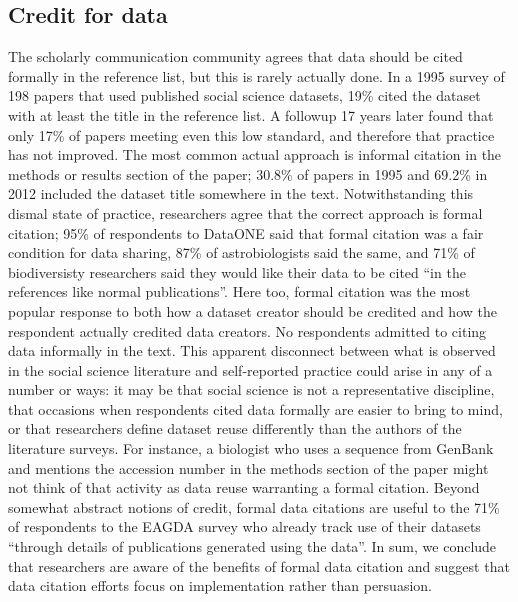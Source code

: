 \documentclass[10pt]{article}
\begin{document}
\subsection*{Credit for data}

The scholarly communication community agrees that data should be cited formally in the reference list\cite{force11_data_citation_synthesis_group_joint_2014}, but this is rarely actually done\cite{sieber_not_1995, mooney_citing_2011, mooney_anatomy_2012}.
In a 1995 survey of 198 papers that used published social science datasets, 19\% cited the dataset with at least the title in the reference list\cite{sieber_not_1995}.
A followup 17 years later found that only 17\% of papers meeting even this low standard, and therefore that practice has not improved\cite{mooney_anatomy_2012}.
The most common actual approach is informal citation in the methods or results section of the paper; 30.8\% of papers in 1995 and 69.2\% in 2012 included the dataset title somewhere in the text.
Notwithstanding this dismal state of practice, researchers agree that the correct approach is formal citation; 95\% of respondents to DataONE said that formal citation was a fair condition for data sharing, 87\% of astrobiologists said the same, and 71\% of biodiversisty researchers said they would like their data to be cited ``in the references like normal publications''\cite{tenopir_data_2011, aydingolu_data_2014, enke_user's_2012}.
Here too, formal citation was the most popular response to both how a dataset creator should be credited and how the respondent actually credited data creators.
No respondents admitted to citing data informally in the text.
This apparent disconnect between what is observed in the social science literature and self-reported practice could arise in any of a number or ways: it may be that social science is not a representative discipline, that occasions when respondents cited data formally are easier to bring to mind, or that researchers define dataset reuse differently than the authors of the literature surveys.
For instance, a biologist who uses a sequence from GenBank and mentions the accession number in the methods section of the paper might not think of that activity as data reuse warranting a formal citation.
Beyond somewhat abstract notions of credit, formal data citations are useful to the 71\% of respondents to the EAGDA survey who already track use of their datasets ``through details of publications generated using the data''\cite{bobrow_establishing_2014}. 
In sum, we conclude that researchers are aware of the benefits of formal data citation and suggest that data citation efforts focus on implementation rather than persuasion. 
\end{document}
